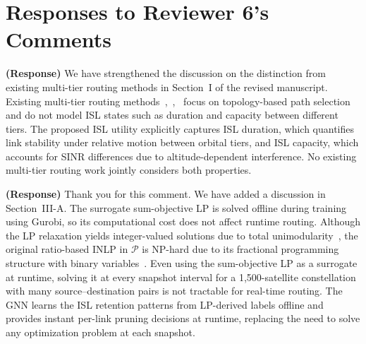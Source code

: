 \documentclass[letter]{article}
\begin{document}
\newpage
\vspace{0.1cm} \noindent
\section*{\large Responses to Reviewer 6's Comments}

\noindent {}

\vspace{5mm}
{\bf (Response)}
We have strengthened the discussion on the distinction from existing multi-tier routing methods in Section~I of the revised manuscript. Existing multi-tier routing methods~\cite{hu2022software},~\cite{yan2024logic},~\cite{huang2026dynamic} focus on topology-based path selection and do not model ISL states such as duration and capacity between different tiers. The proposed ISL utility explicitly captures ISL duration, which quantifies link stability under relative motion between orbital tiers, and ISL capacity, which accounts for SINR differences due to altitude-dependent interference. No existing multi-tier routing work jointly considers both properties.

\vspace{10mm}
\noindent {}

\vspace{5mm}
{\bf (Response)}
Thank you for this comment. We have added a discussion in Section~III-A. The surrogate sum-objective LP is solved offline during training using Gurobi, so its computational cost does not affect runtime routing. Although the LP relaxation yields integer-valued solutions due to total unimodularity~\cite{zhao2022link}, the original ratio-based INLP in $\mathcal{P}$ is NP-hard due to its fractional programming structure with binary variables~\cite{guo2024lightweight}. Even using the sum-objective LP as a surrogate at runtime, solving it at every snapshot interval for a 1,500-satellite constellation with many source--destination pairs is not tractable for real-time routing. The GNN learns the ISL retention patterns from LP-derived labels offline and provides instant per-link pruning decisions at runtime, replacing the need to solve any optimization problem at each snapshot.

\vspace{10mm}
\noindent {}
\end{document}
